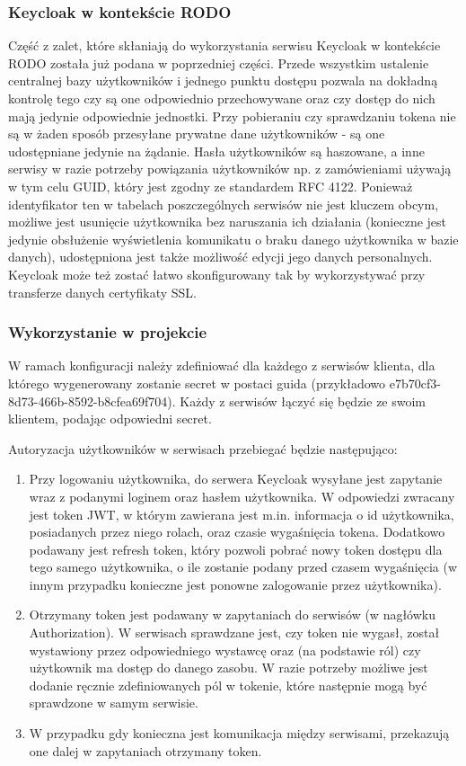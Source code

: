 \documentclass[11pt,a4paper,twoside]{article}
\begin{document}
\subsubsection{Keycloak w kontekście RODO}

Część z zalet, które skłaniają do wykorzystania serwisu Keycloak w kontekście RODO została już podana w poprzedniej części. Przede wszystkim ustalenie centralnej bazy użytkowników i jednego punktu dostępu pozwala na dokładną kontrolę tego czy są one odpowiednio przechowywane oraz czy dostęp do nich mają jedynie odpowiednie jednostki. Przy pobieraniu czy sprawdzaniu tokena nie są w żaden sposób przesyłane prywatne dane użytkowników - są one udostępniane jedynie na żądanie. Hasła użytkowników są haszowane, a inne serwisy w razie potrzeby powiązania użytkowników np. z zamówieniami używają w tym celu GUID, który jest zgodny ze standardem RFC 4122. Ponieważ identyfikator ten w tabelach poszczególnych serwisów nie jest kluczem obcym, możliwe jest usunięcie użytkownika bez naruszania ich działania (konieczne jest jedynie obsłużenie wyświetlenia komunikatu o braku danego użytkownika w bazie danych), udostępniona jest także możliwość edycji jego danych personalnych. Keycloak może też zostać łatwo skonfigurowany tak by wykorzystywać przy transferze danych certyfikaty SSL.

\subsubsection{Wykorzystanie w projekcie}

W ramach konfiguracji należy zdefiniować dla każdego z serwisów klienta, dla którego wygenerowany zostanie secret w postaci guida (przykładowo e7b70cf3-8d73-466b-8592-b8cfea69f704). Każdy z serwisów łączyć się będzie ze swoim klientem, podając odpowiedni secret.

Autoryzacja użytkowników w serwisach przebiegać będzie następująco:
\begin{enumerate}
\item Przy logowaniu użytkownika, do serwera Keycloak wysyłane jest zapytanie wraz z podanymi loginem oraz hasłem użytkownika. W odpowiedzi zwracany jest token JWT, w którym zawierana jest m.in. informacja o id użytkownika, posiadanych przez niego rolach, oraz czasie wygaśnięcia tokena. Dodatkowo podawany jest refresh token, który pozwoli pobrać nowy token dostępu dla tego samego użytkownika, o ile zostanie podany przed czasem wygaśnięcia (w innym przypadku konieczne jest ponowne zalogowanie przez użytkownika).
\item Otrzymany token jest podawany w zapytaniach do serwisów (w nagłówku Authorization). W serwisach sprawdzane jest, czy token nie wygasł, został wystawiony przez odpowiedniego wystawcę oraz (na podstawie ról) czy użytkownik ma dostęp do danego zasobu. W razie potrzeby możliwe jest dodanie ręcznie zdefiniowanych pól w tokenie, które następnie mogą być sprawdzone w samym serwisie.
\item W przypadku gdy konieczna jest komunikacja między serwisami, przekazują one dalej w zapytaniach otrzymany token.
\end{enumerate}
\end{document}
